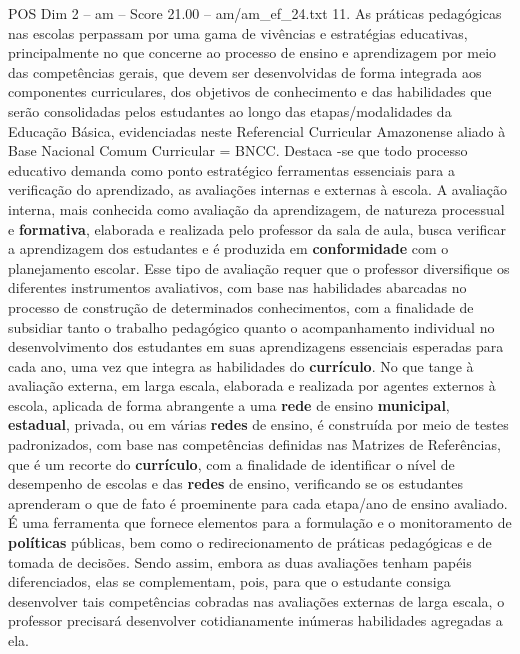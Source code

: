 \begin{textsample}{POS Dim 2 – am – Score 21.00 – am/am\_ef\_24.txt}  \label{ex:f2_pos_160}
11.
As práticas pedagógicas nas escolas perpassam por uma gama de vivências e estratégias educativas, principalmente no que concerne ao processo de ensino e aprendizagem por meio das competências gerais, que devem ser desenvolvidas de forma integrada aos componentes curriculares, dos objetivos de conhecimento e das habilidades que serão consolidadas pelos estudantes ao longo das etapas/modalidades da Educação Básica, evidenciadas neste Referencial Curricular Amazonense aliado à Base Nacional Comum Curricular = BNCC.
Destaca -se que todo processo educativo demanda como ponto estratégico ferramentas essenciais para a verificação do aprendizado, as avaliações internas e externas à escola.
A avaliação interna, mais conhecida como avaliação da aprendizagem, de natureza processual e \textbf{formativa}, elaborada e realizada pelo professor da sala de aula, busca verificar a aprendizagem dos estudantes e é produzida em \textbf{conformidade} com o planejamento escolar.
Esse tipo de avaliação requer que o professor diversifique os diferentes instrumentos avaliativos, com base nas habilidades abarcadas no processo de construção de determinados conhecimentos, com a finalidade de subsidiar tanto o trabalho pedagógico quanto o acompanhamento individual no desenvolvimento dos estudantes em suas aprendizagens essenciais esperadas para cada ano, uma vez que integra as habilidades do \textbf{currículo}.
No que tange à avaliação externa, em larga escala, elaborada e realizada por agentes externos à escola, aplicada de forma abrangente a uma \textbf{rede} de ensino \textbf{municipal}, \textbf{estadual}, privada, ou em várias \textbf{redes} de ensino, é construída por meio de testes padronizados, com base nas competências definidas nas Matrizes de Referências, que é um recorte do \textbf{currículo}, com a finalidade de identificar o nível de desempenho de escolas e das \textbf{redes} de ensino, verificando se os estudantes aprenderam o que de fato é proeminente para cada etapa/ano de ensino avaliado.
É uma ferramenta que fornece elementos para a formulação e o monitoramento de \textbf{políticas} públicas, bem como o redirecionamento de práticas pedagógicas e de tomada de decisões.
Sendo assim, embora as duas avaliações tenham papéis diferenciados, elas se complementam, pois, para que o estudante consiga desenvolver tais competências cobradas nas avaliações externas de larga escala, o professor precisará desenvolver cotidianamente inúmeras habilidades agregadas a ela.

\end{textsample}
